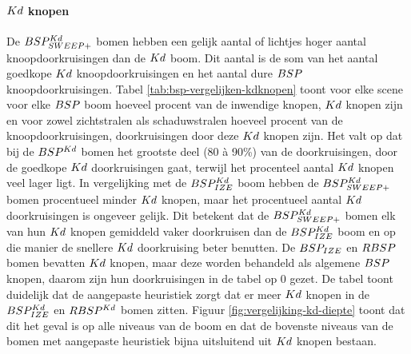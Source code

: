 \paragraph{$Kd$ knopen}
De $BSP^{Kd}_{SWEEP+}$ bomen hebben een gelijk aantal of lichtjes hoger aantal knoopdoorkruisingen dan de $Kd$ boom. Dit aantal is de som van het aantal goedkope $Kd$ knoopdoorkruisingen en het aantal dure $BSP$ knoopdoorkruisingen. Tabel \ref{tab:bsp-vergelijken-kdknopen} toont voor elke scene voor elke $BSP$ boom hoeveel procent van de inwendige knopen, $Kd$ knopen zijn en voor zowel zichtstralen als schaduwstralen hoeveel procent van de knoopdoorkruisingen, doorkruisingen door deze $Kd$ knopen zijn. Het valt op dat bij de $BSP^{Kd}$ bomen het grootste deel (80 à 90\%) van de doorkruisingen, door de goedkope $Kd$ doorkruisingen gaat, terwijl het procenteel aantal $Kd$ knopen veel lager ligt. In vergelijking met de $BSP^{Kd}_{IZE}$ boom hebben de $BSP^{Kd}_{SWEEP+}$ bomen procentueel minder $Kd$ knopen, maar het procentueel aantal $Kd$ doorkruisingen is ongeveer gelijk.
Dit betekent dat de $BSP^{Kd}_{SWEEP+}$ bomen elk van hun $Kd$ knopen gemiddeld vaker doorkruisen dan de $BSP^{Kd}_{IZE}$ boom en op die manier de snellere $Kd$ doorkruising beter benutten.
De $BSP_{IZE}$ en $RBSP$ bomen bevatten $Kd$ knopen, maar deze worden behandeld als algemene $BSP$ knopen, daarom zijn hun doorkruisingen in de tabel op 0 gezet. De tabel toont duidelijk dat de aangepaste heuristiek zorgt dat er meer $Kd$ knopen in de $BSP^{Kd}_{IZE}$ en $RBSP^{Kd}$ bomen zitten. Figuur \ref{fig:vergelijking-kd-diepte} toont dat dit het geval is op alle niveaus van de boom en dat de bovenste niveaus van de bomen met aangepaste heuristiek bijna uitsluitend uit $Kd$ knopen bestaan.

